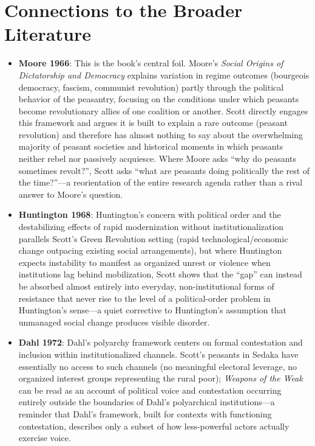 \documentclass[12pt]{article}
\begin{document}
\section{Connections to the Broader Literature}

\begin{itemize}[leftmargin=*, itemsep=4pt]
    \item \textbf{Moore 1966}: This is the book's central foil. Moore's \textit{Social Origins of Dictatorship and Democracy} explains variation in regime outcomes (bourgeois democracy, fascism, communist revolution) partly through the political behavior of the peasantry, focusing on the conditions under which peasants become revolutionary allies of one coalition or another. Scott directly engages this framework and argues it is built to explain a rare outcome (peasant revolution) and therefore has almost nothing to say about the overwhelming majority of peasant societies and historical moments in which peasants neither rebel nor passively acquiesce. Where Moore asks ``why do peasants sometimes revolt?'', Scott asks ``what are peasants doing politically the rest of the time?''---a reorientation of the entire research agenda rather than a rival answer to Moore's question.
    \item \textbf{Huntington 1968}: Huntington's concern with political order and the destabilizing effects of rapid modernization without institutionalization parallels Scott's Green Revolution setting (rapid technological/economic change outpacing existing social arrangements), but where Huntington expects instability to manifest as organized unrest or violence when institutions lag behind mobilization, Scott shows that the ``gap'' can instead be absorbed almost entirely into everyday, non-institutional forms of resistance that never rise to the level of a political-order problem in Huntington's sense---a quiet corrective to Huntington's assumption that unmanaged social change produces visible disorder.
    \item \textbf{Dahl 1972}: Dahl's polyarchy framework centers on formal contestation and inclusion within institutionalized channels. Scott's peasants in Sedaka have essentially no access to such channels (no meaningful electoral leverage, no organized interest groups representing the rural poor); \textit{Weapons of the Weak} can be read as an account of political voice and contestation occurring entirely outside the boundaries of Dahl's polyarchical institutions---a reminder that Dahl's framework, built for contexts with functioning contestation, describes only a subset of how less-powerful actors actually exercise voice.

\end{itemize}
\end{document}
